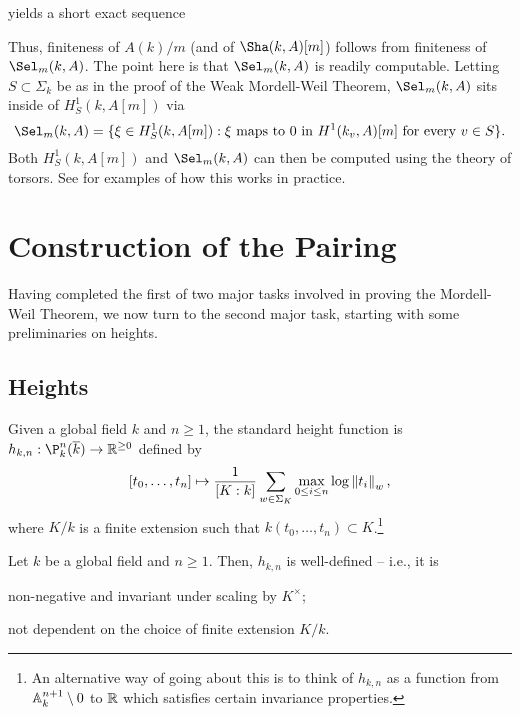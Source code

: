 \documentclass[11pt]{article}
\begin{document}
\begin{remark}
\begin{center}
\end{center}
yields a short exact sequence
\begin{center}
\end{center}
Thus, finiteness of $A(k)/m$ (and of $\Sha(k,A)[m]$) follows from finiteness of $\Sel_m(k,A)$. The point here is that $\Sel_m(k,A)$ is readily computable. Letting $S\subset\Sigma_k$ be as in the proof of the Weak Mordell-Weil Theorem, $\Sel_m(k,A)$ sits inside of $H_S^1(k,A[m])$ via
$$\Sel_m(k,A)=\{\xi\in H_S^1(k,A[m]) : \xi\textrm{ maps to }0\textrm{ in }H^1(k_v,A)[m]\textrm{ for every }v\in S\}.$$
Both $H_S^1(k,A[m])$ and $\Sel_m(k,A)$ can then be computed using the theory of torsors. See \cite{Poonen_SS} for examples of how this works in practice.
\end{remark}

\section{Construction of the Pairing}\label{Pairing_Section}
Having completed the first of two major tasks involved in proving the Mordell-Weil Theorem, we now turn to the second major task, starting with some preliminaries on heights.

\subsection{Heights}
Given a global field $k$ and $n\geq1$, the standard height function is $h_{k,n}: \P_k^n(\ov{k})\to\R^{\geq0}$ defined by 
$$[t_0,\ldots,t_n]\mapsto\dfrac{1}{[K:k]}\sum_{w\in\Sigma_K}\max_{0\leq i\leq n}\log\left\lVert t_i\right\rVert_w,$$
where $K/k$ is a finite extension such that $k(t_0,\ldots,t_n)\subset K$.\footnote{An alternative way of going about this is to think of $h_{k,n}$ as a function from $\mathbb{A}_k^{n+1}\setminus0$ to $\mathbb{R}$ which satisfies certain invariance properties.}

\begin{proposition}\label{height_well_defined}
Let $k$ be a global field and $n\geq1$. Then, $h_{k,n}$ is well-defined -- i.e., it is
\begin{enum}{\arabic}
\item non-negative and invariant under scaling by $K^{\times}$;
\item not dependent on the choice of finite extension $K/k$.
\end{enum}
\end{proposition}
\end{document}
